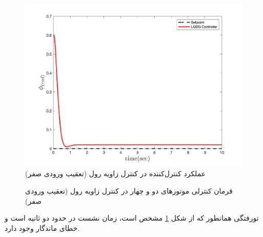 \begin{figure}[H]
	\includegraphics[width=.48\linewidth]{../Figures/MIL/LQDG/Roll/lqdg_roll_nn.png}
	\centering
	\caption{عملكرد کنترل‌کننده  در کنترل زاويه رول (تعقیب ورودی صفر)}
	\label{lqdg_roll_fig_simulation}
\end{figure}
\begin{figure}[H]
	\centering
	\caption{‫‪فرمان کنترلی موتورهای دو و چهار در کنترل زاویه رول (تعقیب ورودی صفر)}
\end{figure}

‌تورفتگی همانطور که از شکل
\ref{lqdg_roll_fig_simulation}
مشخص است، زمان نشست در حدود دو ثانیه است و خطای ماندگار وجود دارد.